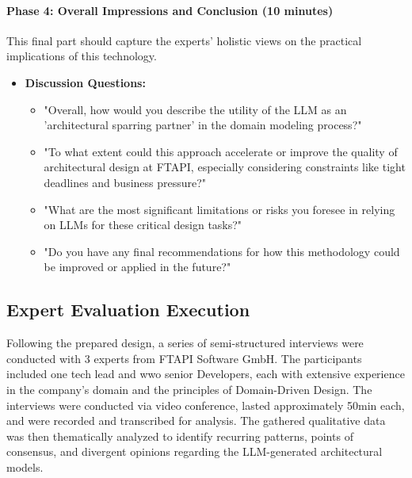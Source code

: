 \paragraph{Phase 4: Overall Impressions and Conclusion (10 minutes)}
This final part should capture the experts' holistic views on the practical implications of this technology.

\begin{itemize}
    \item \textbf{Discussion Questions:}
    \begin{itemize}
        \item "Overall, how would you describe the utility of the LLM as an 'architectural sparring partner' in the domain modeling process?"
        \item "To what extent could this approach accelerate or improve the quality of architectural design at FTAPI, especially considering constraints like tight deadlines and business pressure?"
        \item "What are the most significant limitations or risks you foresee in relying on LLMs for these critical design tasks?"
        \item "Do you have any final recommendations for how this methodology could be improved or applied in the future?"
    \end{itemize}
\end{itemize}

\subsection{Expert Evaluation Execution}
Following the prepared design, a series of semi-structured interviews were conducted with 3 experts from FTAPI Software GmbH. The participants included one tech lead and wwo senior Developers, each with extensive experience in the company's domain and the principles of Domain-Driven Design. The interviews were conducted via video conference, lasted approximately 50min each, and were recorded and transcribed for analysis. The gathered qualitative data was then thematically analyzed to identify recurring patterns, points of consensus, and divergent opinions regarding the LLM-generated architectural models.